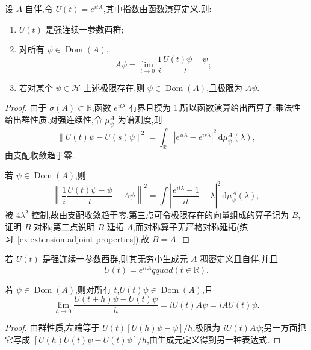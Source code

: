 \begin{proposition}[自伴算子生成一参数酉群]\label{prop:selfadjoint-generates-unitary}
设 \(A\) 自伴,令 \(U(t)=e^{itA}\),其中指数由函数演算定义.则:
\begin{enumerate}
\item \(U(t)\) 是强连续一参数酉群;
\item 对所有 \(\psi\in\operatorname{Dom}(A)\),
\[
A\psi=\lim_{t\to0}\frac{1}{i}\frac{U(t)\psi-\psi}{t};
\]
\item 若对某个 \(\psi\in\mathcal{H}\) 上述极限存在,则 \(\psi\in\operatorname{Dom}(A)\),且极限为 \(A\psi\).
\end{enumerate}
\end{proposition}

\begin{proof}
由于 \(\sigma(A)\subset\mathbb{R}\),函数 \(e^{it\lambda}\) 有界且模为 1,所以函数演算给出酉算子;乘法性给出群性质.对强连续性,令 \(\mu_{\psi}^{A}\) 为谱测度,则
\[
\|U(t)\psi-U(s)\psi\|^{2}
=\int_{\mathbb{R}}|e^{it\lambda}-e^{is\lambda}|^{2}\,\mathrm{d}\mu_{\psi}^{A}(\lambda),
\]
由支配收敛趋于零.

若 \(\psi\in\operatorname{Dom}(A)\),则
\[
\left\|\frac{1}{i}\frac{U(t)\psi-\psi}{t}-A\psi\right\|^{2}
=\int\left|\frac{e^{it\lambda}-1}{it}-\lambda\right|^{2}\,\mathrm{d}\mu_{\psi}^{A}(\lambda),
\]
被 \(4\lambda^{2}\) 控制,故由支配收敛趋于零.第三点可令极限存在的向量组成的算子记为 \(B\),证明 \(B\) 对称;第二点说明 \(B\) 延拓 \(A\),而对称算子无严格对称延拓(练习~\ref{ex:extension-adjoint-properties}),故 \(B=A\).
\end{proof}

\begin{theorem}[Stone 定理]\label{thm:stone}
若 \(U(t)\) 是强连续一参数酉群,则其无穷小生成元 \(A\) 稠密定义且自伴,并且
\[
U(t)=e^{itA}qquad(t\in\mathbb{R}).
\]
\end{theorem}

\begin{lemma}[生成元定义域的不变性]\label{lem:generator-domain-invariant}
若 \(\psi\in\operatorname{Dom}(A)\),则对所有 \(t\),\(U(t)\psi\in\operatorname{Dom}(A)\),且
\[
\lim_{h\to0}\frac{U(t+h)\psi-U(t)\psi}{h}
=iU(t)A\psi=iAU(t)\psi.
\]
\end{lemma}

\begin{proof}
由群性质,左端等于 \(U(t)[U(h)\psi-\psi]/h\),极限为 \(iU(t)A\psi\);另一方面把它写成 \([U(h)U(t)\psi-U(t)\psi]/h\),由生成元定义得到另一种表达式.
\end{proof}

